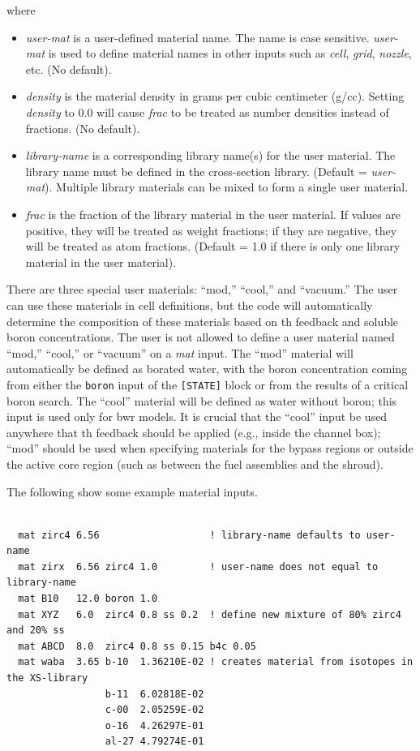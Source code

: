 where
\begin{itemize}
\item {\it user-mat} is a user-defined material name. The name is case sensitive. {\it user-mat} is used to
define material names in other inputs such as {\it cell}, {\it grid}, {\it nozzle}, etc. (No default).
\item {\it density} is the material density in grams per cubic centimeter (g/cc). Setting {\it density} to 0.0 will cause {\it frac} to be treated as number densities instead of fractions. (No default).
\item {\it library-name} is a corresponding library name(s) for the user material. The library name
must be defined in the cross-section library. (Default = {\it user-mat}). Multiple library materials
can be mixed to form a single user material.
\item {\it frac} is the fraction of the library material in the user material. If values are positive, they will be treated as weight fractions; if they are negative, they will be treated as atom fractions.  (Default = 1.0 if there is only one library material in the user material).
\end{itemize}

There are three special user materials: ``mod,'' ``cool,'' and ``vacuum.''
The user can use these materials in cell definitions, but the code will automatically
determine the composition of these materials based on \ac{th} feedback and soluble boron concentrations.
The user is not allowed to define a user material named ``mod,'' ``cool,'' or ``vacuum'' on a {\it mat} input.
The ``mod'' material will automatically be defined as borated water, with the boron concentration coming
from either the \texttt{boron} input of the \texttt{[STATE]} block or from the results of a critical
boron search.  The ``cool'' material will be defined as water without boron; this input is used
only for \ac{bwr} models.  It is crucial that the ``cool'' input be used anywhere that \ac{th} feedback should be applied
(e.g., inside the channel box); ``mod'' should be used when specifying materials for the bypass regions or
outside the active core region (such as between the fuel assemblies and the shroud).

The following show some example material inputs.
\begin{Verbatim}[fontsize=\small]

  mat zirc4 6.56                   ! library-name defaults to user-name
  mat zirx  6.56 zirc4 1.0         ! user-name does not equal to library-name
  mat B10   12.0 boron 1.0
  mat XYZ   6.0  zirc4 0.8 ss 0.2  ! define new mixture of 80% zirc4 and 20% ss
  mat ABCD  8.0  zirc4 0.8 ss 0.15 b4c 0.05
  mat waba  3.65 b-10  1.36210E-02 ! creates material from isotopes in the XS-library
                 b-11  6.02818E-02
                 c-00  2.05259E-02
                 o-16  4.26297E-01
                 al-27 4.79274E-01

\end{Verbatim}

